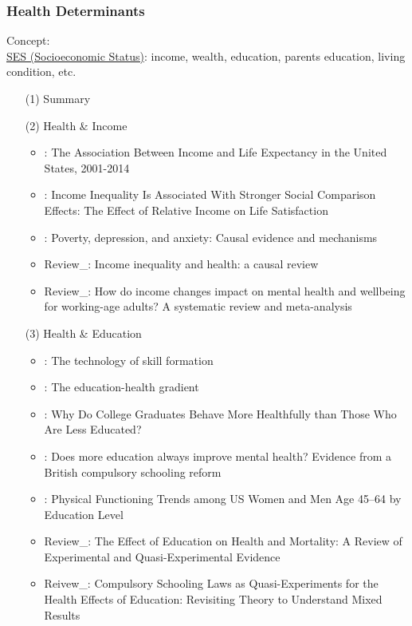 \documentclass[12pt]{article}
\begin{document}
\subsubsection{Health Determinants}
Concept: \\
\uline{SES (Socioeconomic Status)}: income, wealth, education, parents education, living condition, etc.
\begin{itemize}
    \item[(1)] Summary
    \item[(2)] Health \& Income
    \begin{itemize}
        \item \cite{chetty2016association}: The Association Between Income and Life Expectancy in the United States, 2001-2014
        \item \cite{cheung2016income}: Income Inequality Is Associated With Stronger Social Comparison Effects: The Effect of Relative Income on Life Satisfaction
        \item \cite{ridley2020poverty}: Poverty, depression, and anxiety: Causal evidence and mechanisms
        \item Review\_\cite{pickett2015income}: Income inequality and health: a causal review
        \item Review\_\cite{thomson2022income}: How do income changes impact on mental health and wellbeing for working-age adults? A systematic review and meta-analysis
    \end{itemize}
    \item[(3)] Health \& Education
    \begin{itemize}
         \item \cite{cunha2007technology}: The technology of skill formation
         \item \cite{conti2010education}: The education-health gradient
         \item \cite{lawrence2017college}: Why Do College Graduates Behave More Healthfully than Those Who Are Less Educated?
        \item \cite{avendano2017does}: Does more education always improve mental health? Evidence from a British compulsory schooling reform
        \item \cite{zajacova2017physical}: Physical Functioning Trends among US Women and Men Age 45–64 by Education Level
        \item Review\_\cite{galama2018effect}: The Effect of Education on Health and Mortality: A Review of Experimental and Quasi-Experimental Evidence 
        \item Reivew\_\cite{glymour2018compulsory}: Compulsory Schooling Laws as Quasi-Experiments for the Health Effects of Education: Revisiting Theory to Understand Mixed Results

\end{itemize}
\end{itemize}
\end{document}
